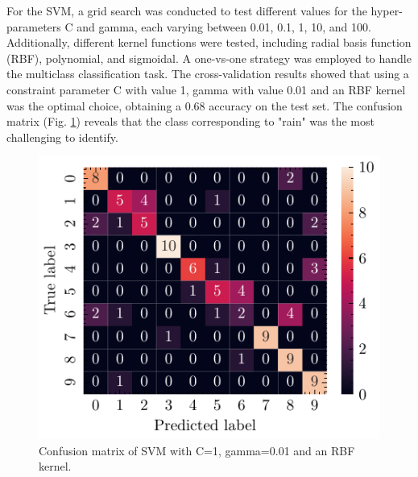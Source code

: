 \documentclass[journal]{IEEEtran}
\begin{document}
For the SVM, a grid search was conducted to test different values for the hyper-parameters C and gamma, each varying between 0.01, 0.1, 1, 10, and 100. Additionally, different kernel functions were tested, including radial basis function (RBF), polynomial, and sigmoidal. A one-vs-one strategy was employed to handle the multiclass classification task.
The cross-validation results showed that using a constraint parameter C with value 1, gamma with value 0.01 and an RBF kernel was the optimal choice, obtaining a 0.68 accuracy on the test set. The confusion matrix (Fig. \ref{fig:svm_confusion_matrix}) reveals that the class corresponding to "rain" was the most challenging to identify.
\begin{figure}[ht]
    \centering
    \includegraphics[width=\linewidth]{confusion_matrix_svm.pdf}
    \caption{Confusion matrix of SVM with C=1, gamma=0.01 and an RBF kernel.}
    \label{fig:svm_confusion_matrix}
\end{figure}
\end{document}
